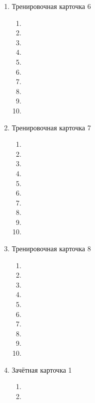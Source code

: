 \documentclass[12pt, a4paper]{article}
\begin{document}
\begin{enumerate}
\begin{enumerate}[label=\asbuk*)]
			\item 
			\item 
			\item 
			\item 
			\item 
		\end{enumerate}
		\item Тренировочная карточка 6
		\begin{enumerate}[label=\asbuk*)]
			\item 
			\item 
			\item 
			\item
			\item 
			\item 
			\item 
			\item
			\item 
			\item 
		\end{enumerate}
	\item Тренировочная карточка 7
	\begin{enumerate}[label=\asbuk*)]
		\item 
		\item 
		\item
		\item 
		\item 
		\item 
		\item 
		\item 
		\item 
		\item 
	\end{enumerate}
	\item Тренировочная карточка 8
	\begin{enumerate}[label=\asbuk*)]
		\item 
		\item 
		\item 
		\item 
		\item 
		\item 
		\item 
		\item 
		\item 
		\item 
	\end{enumerate}
	\item Зачётная карточка 1
	\begin{enumerate}[label=\asbuk*)]
		\item 
		\item 

\end{enumerate}
\end{enumerate}
\end{document}
